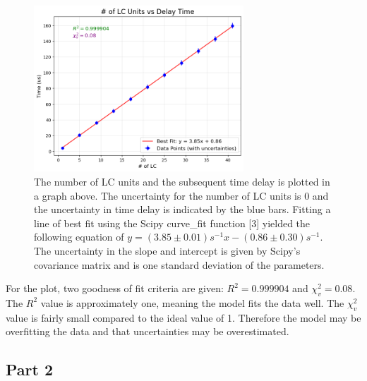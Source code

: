 \documentclass[12pt]{article}
\begin{document}
\begin{figure}[H]
    \centering
    \includegraphics[width=0.7\textwidth]{img/plot.png}
    \caption{The number of LC units and the subsequent time delay is plotted in a graph above. 
    The uncertainty for the number of LC units is 0 and the uncertainty in time delay is indicated by the blue bars. Fitting a line of best fit using the Scipy curve\_fit function [3] yielded the following equation of $y=(3.85\pm0.01)s^{-1}x - (0.86\pm0.30)s^{-1}$. The uncertainty in the slope and intercept is given by Scipy's covariance matrix and is one standard deviation of the parameters.}
    \label{fig:plot}
\end{figure}

For the plot, two goodness of fit criteria are given: $R^2 = 0.999904$ and $\chi_v^2 = 0.08$. The $R^2$ value is approximately one, meaning the model fits the data well. The $\chi_v^2$ value is fairly small compared to the ideal value of 1. Therefore the model may be overfitting the data and that uncertainties may be overestimated.

\subsection*{Part 2}
\end{document}
